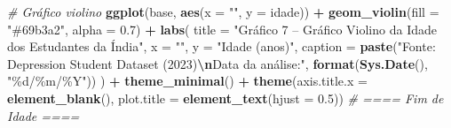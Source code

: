 \documentclass[
]{article}
\newenvironment{Shaded}{\begin{snugshade}}{\end{snugshade}}
\newcommand{\AttributeTok}[1]{\textcolor[rgb]{0.13,0.29,0.53}{#1}}
\newcommand{\CommentTok}[1]{\textcolor[rgb]{0.56,0.35,0.01}{\textit{#1}}}
\newcommand{\FloatTok}[1]{\textcolor[rgb]{0.00,0.00,0.81}{#1}}
\newcommand{\FunctionTok}[1]{\textcolor[rgb]{0.13,0.29,0.53}{\textbf{#1}}}
\newcommand{\NormalTok}[1]{#1}
\newcommand{\SpecialCharTok}[1]{\textcolor[rgb]{0.81,0.36,0.00}{\textbf{#1}}}
\newcommand{\StringTok}[1]{\textcolor[rgb]{0.31,0.60,0.02}{#1}}
\begin{document}
\begin{Shaded}
\begin{Highlighting}[]
\CommentTok{\# Gráfico violino}
\FunctionTok{ggplot}\NormalTok{(base, }\FunctionTok{aes}\NormalTok{(}\AttributeTok{x =} \StringTok{""}\NormalTok{, }\AttributeTok{y =}\NormalTok{ idade)) }\SpecialCharTok{+}
  \FunctionTok{geom\_violin}\NormalTok{(}\AttributeTok{fill =} \StringTok{"\#69b3a2"}\NormalTok{, }\AttributeTok{alpha =} \FloatTok{0.7}\NormalTok{) }\SpecialCharTok{+}
  \FunctionTok{labs}\NormalTok{(}
    \AttributeTok{title =} \StringTok{"Gráfico 7 – Gráfico Violino da Idade dos Estudantes da Índia"}\NormalTok{,}
    \AttributeTok{x =} \StringTok{""}\NormalTok{,}
    \AttributeTok{y =} \StringTok{"Idade (anos)"}\NormalTok{,}
    \AttributeTok{caption =} \FunctionTok{paste}\NormalTok{(}\StringTok{"Fonte: Depression Student Dataset (2023)}\SpecialCharTok{\textbackslash{}n}\StringTok{Data da análise:"}\NormalTok{, }\FunctionTok{format}\NormalTok{(}\FunctionTok{Sys.Date}\NormalTok{(), }\StringTok{"\%d/\%m/\%Y"}\NormalTok{))}
\NormalTok{  ) }\SpecialCharTok{+}
  \FunctionTok{theme\_minimal}\NormalTok{() }\SpecialCharTok{+}
  \FunctionTok{theme}\NormalTok{(}\AttributeTok{axis.title.x =} \FunctionTok{element\_blank}\NormalTok{(), }\AttributeTok{plot.title =} \FunctionTok{element\_text}\NormalTok{(}\AttributeTok{hjust =} \FloatTok{0.5}\NormalTok{))}
\CommentTok{\# ==== Fim de Idade ====}





\end{Highlighting}
\end{Shaded}
\end{document}
